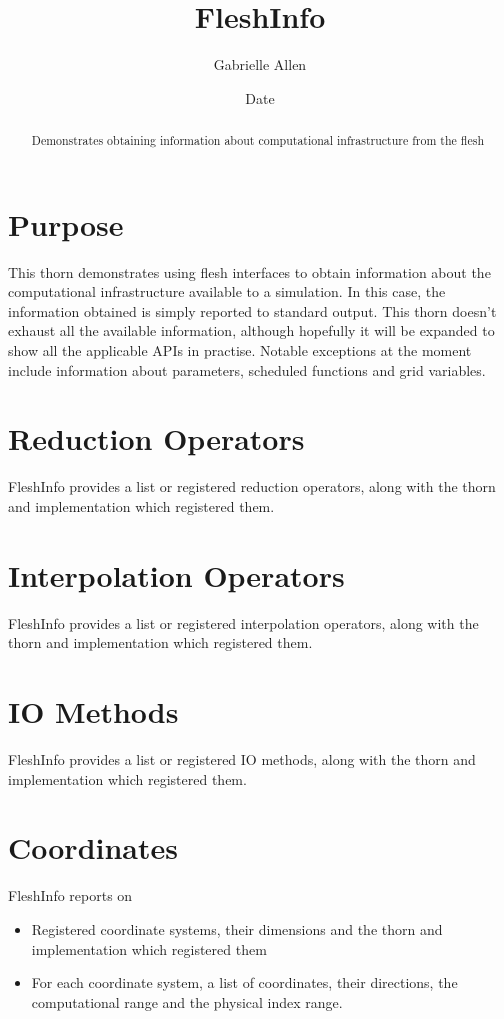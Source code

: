 \documentclass{article}
\begin{document}
\title{FleshInfo}
\author{Gabrielle Allen}
\date{$ $Date$ $}

\maketitle


\begin{abstract}
Demonstrates obtaining information about computational infrastructure
from the flesh
\end{abstract}

\section{Purpose}

This thorn demonstrates using flesh interfaces to obtain information
about the computational infrastructure available to a simulation. 
In this case, the information obtained is simply reported to standard
output. This thorn doesn't exhaust all the available information, although
hopefully it will be expanded to show all the applicable APIs in practise.
Notable exceptions at the moment include information about parameters, 
scheduled functions and grid variables.

\section{Reduction Operators}

FleshInfo provides a list or registered reduction operators, along 
with the thorn and implementation which registered them.

\section{Interpolation Operators}

FleshInfo provides a list or registered interpolation operators, along 
with the thorn and implementation which registered them.

\section{IO Methods}

FleshInfo provides a list or registered IO methods, along 
with the thorn and implementation which registered them.

\section{Coordinates}
FleshInfo reports on
\begin{itemize}
\item Registered coordinate systems, their dimensions and the thorn
	and implementation which registered them
\item For each coordinate system, a list of coordinates, their
	directions, the computational range and the physical index range.
\end{itemize}

\end{document}
